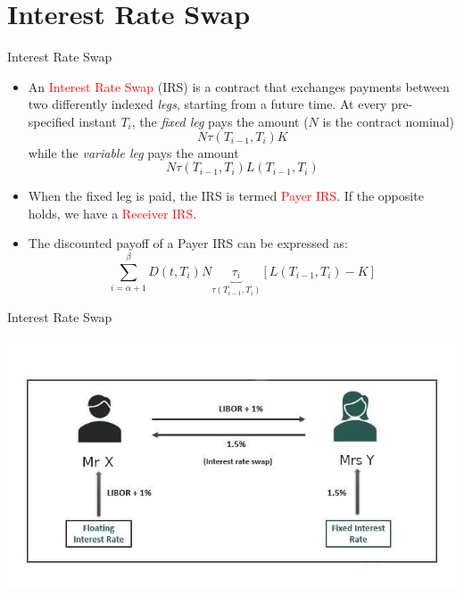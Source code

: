 \documentclass{beamer}
\begin{document}
\section{Interest Rate Swap}
\begin{frame}{Interest Rate Swap}
	\begin{itemize}
		\item An \textcolor{red}{Interest Rate Swap} (IRS) is a contract that exchanges payments between two differently indexed \emph{legs}, starting from a future time. At every pre-specified instant $T_i$, the \emph{fixed leg} pays the amount ($N$ is the contract nominal)
		\begin{equation*}
			N\tau(T_{i-1}, T_i)K
		\end{equation*}
		while the \emph{variable leg} pays the amount
		\begin{equation*}
			N\tau(T_{i-1}, T_i)L(T_{i-1}, T_i)
		\end{equation*}
		\item<2-> When the fixed leg is paid, the IRS is termed \textcolor{red}{Payer IRS}. If the opposite holds, we have a \textcolor{red}{Receiver IRS}.
		\item<3-> The discounted payoff of a Payer IRS can be expressed as:
		\begin{equation}
			\sum_{i=\alpha+1}^{\beta} D(t,T_i)N \underbrace{\tau_i}_{\tau(T_{i-1},T_i)}
			\left[L(T_{i-1},T_i)-K\right]
			\label{eq:payoff_payer_irs}
		\end{equation}	
	\end{itemize}
\end{frame}

\begin{frame}{Interest Rate Swap}
\begin{center}
	\includegraphics[width=0.9\linewidth]{Interest-Rate-Swap-diagram}
\end{center}
\end{frame}
\end{document}
